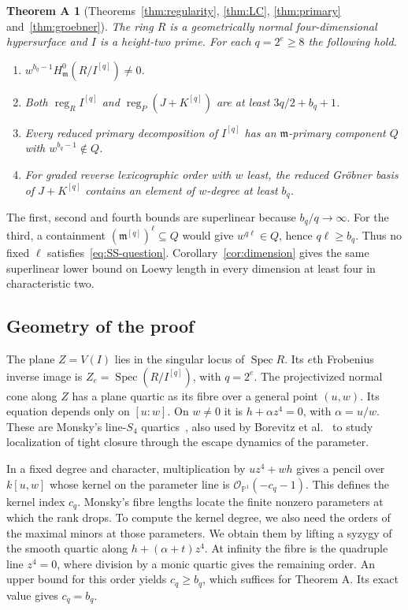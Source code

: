 \documentclass[11pt,a4paper,reqno]{amsart}
\numberwithin{equation}{section}
\theoremstyle{plain}
\newtheorem*{theoremA}{Theorem A}
\theoremstyle{definition}
\theoremstyle{remark}
\newcommand{\mm}{\mathfrak m}
\DeclareMathOperator{\reg}{reg}
\DeclareMathOperator{\Spec}{Spec}
\begin{document}
\begin{theoremA}[Theorems~\ref{thm:regularity}, \ref{thm:LC}, \ref{thm:primary} and~\ref{thm:groebner}]
The ring $R$ is a geometrically normal four-dimensional hypersurface
and $I$ is a height-two prime. For each $q=2^e\geq8$ the following hold.
\begin{enumerate}
\item $w^{b_q-1}H^0_{\mm}(R/I^{[q]})\ne0$.
\item Both $\reg_R I^{[q]}$ and $\reg_P(J+K^{[q]})$ are at least
$3q/2+b_q+1$.
\item Every reduced primary decomposition of $I^{[q]}$ has an
$\mm$-primary component $Q$ with $w^{b_q-1}\notin Q$.
\item For graded reverse lexicographic order with $w$ least, the
reduced Gr\"obner basis of $J+K^{[q]}$ contains an element of
$w$-degree at least $b_q$.
\end{enumerate}
\end{theoremA}

The first, second and fourth bounds are superlinear because
$b_q/q\to\infty$. For the third, a containment
$(\mm^{[q]})^\ell\subseteq Q$ would give $w^{q\ell}\in Q$, hence
$q\ell\geq b_q$. Thus no fixed $\ell$ satisfies~\eqref{eq:SS-question}.
Corollary~\ref{cor:dimension} gives the same superlinear lower bound on Loewy length in every dimension at least four in characteristic two.

\subsection*{Geometry of the proof}
The plane $Z=V(I)$ lies in the singular locus of $\Spec R$. Its $e$th Frobenius inverse image is $Z_e=\Spec(R/I^{[q]})$, with $q=2^e$.
The projectivized normal cone along $Z$ has a plane quartic as its
fibre over a general point $(u,w)$. Its equation depends only on
$[u:w]$. On $w\ne0$ it is $h+\alpha z^4=0$, with $\alpha=u/w$.
These are Monsky's line-$S_4$ quartics~\cite{Monsky}, also used by
Borevitz et al.~\cite{Borevitz} to study localization of tight closure
through the escape dynamics of the parameter. 

In a fixed degree and character, multiplication by $uz^4+wh$ gives
a pencil over $k[u,w]$ whose kernel on the parameter line is
$\mathcal O_{\mathbb P^1}(-c_q-1)$. This defines the kernel index $c_q$. Monsky's fibre lengths locate the finite nonzero parameters
at which the rank drops. To compute the kernel degree, we also need
the orders of the maximal minors at those parameters. We obtain them
by lifting a syzygy of the smooth quartic along $h+(\alpha+t)z^4$.
At infinity the fibre is the quadruple line $z^4=0$, where division
by a monic quartic gives the remaining order. An upper bound for this
order yields $c_q\geq b_q$, which suffices for Theorem A. Its exact
value gives $c_q=b_q$.
\end{document}

